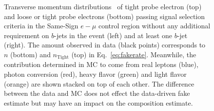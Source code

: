 \begin{figure}[h!]
{}
\vspace{-10mm}\caption{Transverse momentum distributions \pt\ of tight probe electron (top) and loose or tight probe electrons (bottom) passing signal selection criteria in the Same-Sign $e-\mu$ control region without any additional requirement on $b$-jets in the event (left) and at least one $b$-jet (right).
The amount observed in data (black points) corresponds to $n$ (bottom) and $n_{\textrm{Tight}}$ (top) in Eq.~\ref{eq:fakerate}. 
Meanwhile, the contribution determined in MC to come from real leptons (blue), photon conversion (red), heavy flavor (green) and light
flavor (orange) are shown stacked on top of each other.
The difference between the data and MC does not effect the data-driven
fake estimate but may have an impact on the composition estimate.
}
\label{fig:fakeEff_CRs_electron_stacked}
\end{figure}



